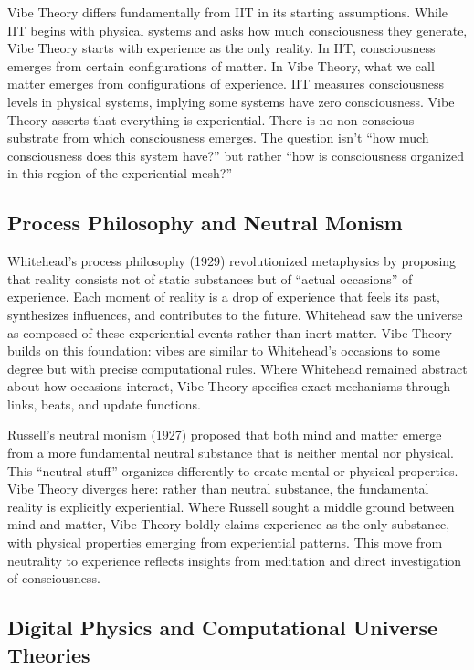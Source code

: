 Vibe Theory differs fundamentally from IIT in its starting assumptions. While IIT begins with physical systems and asks how much consciousness they generate, Vibe Theory starts with experience as the only reality. In IIT, consciousness emerges from certain configurations of matter. In Vibe Theory, what we call matter emerges from configurations of experience. IIT measures consciousness levels in physical systems, implying some systems have zero consciousness. Vibe Theory asserts that everything is experiential. There is no non-conscious substrate from which consciousness emerges. The question isn't ``how much consciousness does this system have?'' but rather ``how is consciousness organized in this region of the experiential mesh?''

\subsection{Process Philosophy and Neutral Monism}

Whitehead's process philosophy (1929) revolutionized metaphysics by proposing that reality consists not of static substances but of ``actual occasions'' of experience. Each moment of reality is a drop of experience that feels its past, synthesizes influences, and contributes to the future. Whitehead saw the universe as composed of these experiential events rather than inert matter. Vibe Theory builds on this foundation: vibes are similar to Whitehead's occasions to some degree but with precise computational rules. Where Whitehead remained abstract about how occasions interact, Vibe Theory specifies exact mechanisms through links, beats, and update functions.

Russell's neutral monism (1927) proposed that both mind and matter emerge from a more fundamental neutral substance that is neither mental nor physical. This ``neutral stuff'' organizes differently to create mental or physical properties. Vibe Theory diverges here: rather than neutral substance, the fundamental reality is explicitly experiential. Where Russell sought a middle ground between mind and matter, Vibe Theory boldly claims experience as the only substance, with physical properties emerging from experiential patterns. This move from neutrality to experience reflects insights from meditation and direct investigation of consciousness.

\subsection{Digital Physics and Computational Universe Theories}

